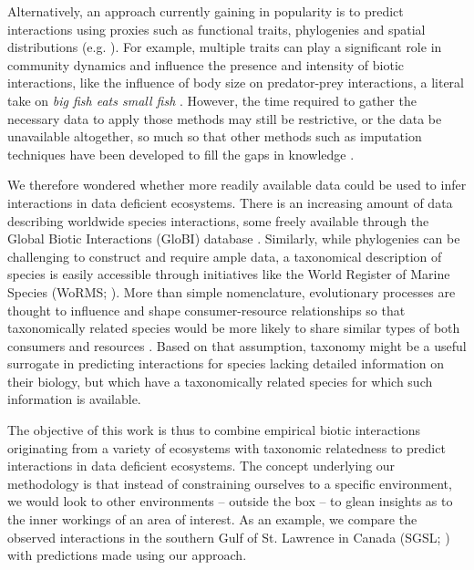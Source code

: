 Alternatively, an approach currently gaining in popularity is to predict interactions using proxies such as functional traits, phylogenies and spatial distributions (e.g. \cite{morales-castilla2015, bartomeus2016}). For example, multiple traits can play a significant role in community dynamics and influence the presence and intensity of biotic interactions, like the influence of body size on predator-prey interactions, a literal take on \emph{big fish eats small fish} \citep{cohen2003, brose2006a, gravel2013, seguin2014}. However, the time required to gather the necessary data to apply those methods may still be restrictive, or the data be unavailable altogether, so much so that other methods such as imputation techniques have been developed to fill the gaps in knowledge \citep[e.g.][]{penone2014, schrodt2015}.

We therefore wondered whether more readily available data could be used to infer interactions in data deficient ecosystems. There is an increasing amount of data describing worldwide species interactions, some freely available through the Global Biotic Interactions (GloBI) database \citep{poelen2014}. Similarly, while phylogenies can be challenging to construct and require ample data, a taxonomical description of species is easily accessible through initiatives like the World Register of Marine Species (WoRMS; \cite{bailly2016}). More than simple nomenclature, evolutionary processes are thought to influence and shape consumer-resource relationships \citep{mouquet2012, rohr2014} so that taxonomically related species would be more likely to share similar types of both consumers and resources \citep{eklof2012, morales-castilla2015, gray2015}. Based on that assumption, taxonomy might be a useful surrogate in predicting interactions for species lacking detailed information on their biology, but which have a taxonomically related species for which such information is available.

The objective of this work is thus to combine empirical biotic interactions originating from a variety of ecosystems with taxonomic relatedness to predict interactions in data deficient ecosystems. The concept underlying our methodology is that instead of constraining ourselves to a specific environment, we would look to other environments – outside the box – to glean insights as to the inner workings of an area of interest. As an example, we compare the observed interactions in the southern Gulf of St. Lawrence in Canada (SGSL; \cite{savenkoff2004}) with predictions made using our approach.

